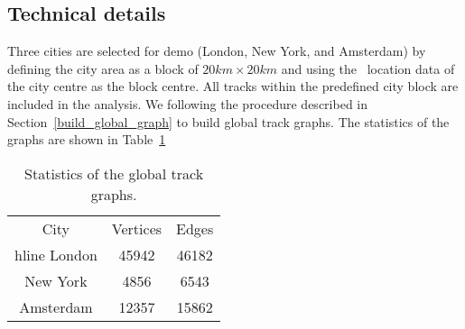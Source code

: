 \subsection{Technical details}

Three cities are selected for demo (London, New York, and Amsterdam) by defining the city area as a block of $20km\times20km$ and using the \gps\ location data of the city centre as the block centre.
All tracks within the predefined city block are included in the analysis.
We following the procedure described in Section~\ref{build_global_graph} to build global track graphs.
The statistics of the graphs are shown in Table~\ref{graph_statistics}
\begin{table}
	\begin{center}
		\begin{tabular}{|c|c|c|}\hline
			City & Vertices & Edges  \\ hline 
			London & 45942 & 46182\\ \hline
			New York & 4856 & 6543\\ \hline
			Amsterdam & 12357 & 15862 \\ \hline
		\end{tabular}
		\caption{Statistics of the global track graphs.}
		\label{graph_statistics}
	\end{center}
\end{table}










